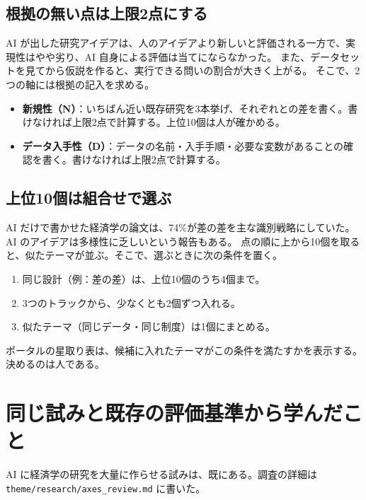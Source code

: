 \documentclass[a4paper,10pt]{ltjsarticle}
\begin{document}
\subsection{根拠の無い点は上限2点にする}
AI が出した研究アイデアは、人のアイデアより新しいと評価される一方で、実現性はやや劣り、AI 自身による評価は当てにならなかった\parencite{si2024}。
また、データセットを見てから仮説を作ると、実行できる問いの割合が大きく上がる\parencite{zhu2026}。
そこで、2つの軸には根拠の記入を求める。
\begin{itemize}[leftmargin=*]
  \item \textbf{新規性（N）}：いちばん近い既存研究を3本挙げ、それぞれとの差を書く。書けなければ上限2点で計算する。上位10個は人が確かめる。
  \item \textbf{データ入手性（D）}：データの名前・入手手順・必要な変数があることの確認を書く。書けなければ上限2点で計算する。
\end{itemize}

\subsection{上位10個は組合せで選ぶ}
AI だけで書かせた経済学の論文は、74\%が差の差を主な識別戦略にしていた\parencite{li2026}。AI のアイデアは多様性に乏しいという報告もある\parencite{si2024}。
点の順に上から10個を取ると、似たテーマが並ぶ。そこで、選ぶときに次の条件を置く。
\begin{enumerate}[leftmargin=*]
  \item 同じ設計（例：差の差）は、上位10個のうち4個まで。
  \item 3つのトラックから、少なくとも2個ずつ入れる。
  \item 似たテーマ（同じデータ・同じ制度）は1個にまとめる。
\end{enumerate}
ポータルの星取り表は、候補に入れたテーマがこの条件を満たすかを表示する。決めるのは人である。

\section{同じ試みと既存の評価基準から学んだこと}\label{sec:th-others}

AI に経済学の研究を大量に作らせる試みは、既にある。調査の詳細は \texttt{theme/research/axes\_review.md} に書いた。
\end{document}
